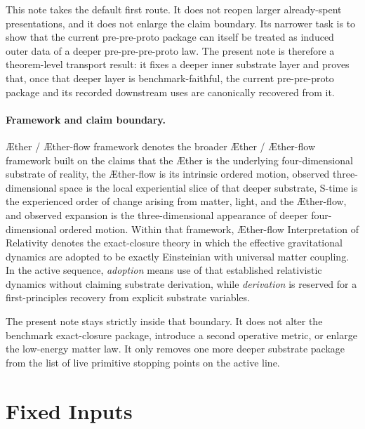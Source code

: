 \documentclass[11pt]{article}
\newcommand{\Aether}{\AE{}ther}
\newcommand{\Aflow}{\AE{}ther-flow}
\newcommand{\TheoryName}{\Aflow{} Interpretation of Relativity}
\newcommand{\TheoryProgram}{\Aether{} / \Aflow{} framework}
\begin{document}
This note takes the default first route. It does not reopen larger already-spent presentations, and it does not enlarge the claim boundary. Its narrower task is to show that the current pre-pre-proto package can itself be treated as induced outer data of a deeper pre-pre-pre-proto law. The present note is therefore a theorem-level transport result: it fixes a deeper inner substrate layer and proves that, once that deeper layer is benchmark-faithful, the current pre-pre-proto package and its recorded downstream uses are canonically recovered from it.

\paragraph{Framework and claim boundary.}
\TheoryProgram{} denotes the broader \Aether{} / \Aflow{} framework built on the claims that the \Aether{} is the underlying four-dimensional substrate of reality, the \Aflow{} is its intrinsic ordered motion, observed three-dimensional space is the local experiential slice of that deeper substrate, S-time is the experienced order of change arising from matter, light, and the \Aflow{}, and observed expansion is the three-dimensional appearance of deeper four-dimensional ordered motion. Within that framework, \TheoryName{} denotes the exact-closure theory in which the effective gravitational dynamics are adopted to be exactly Einsteinian with universal matter coupling. In the active sequence, \emph{adoption} means use of that established relativistic dynamics without claiming substrate derivation, while \emph{derivation} is reserved for a first-principles recovery from explicit substrate variables.

The present note stays strictly inside that boundary. It does not alter the benchmark exact-closure package, introduce a second operative metric, or enlarge the low-energy matter law. It only removes one more deeper substrate package from the list of live primitive stopping points on the active line.

\section{Fixed Inputs}
\end{document}
